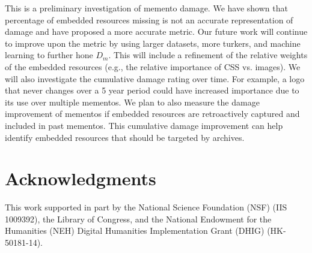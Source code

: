 This is a preliminary investigation of memento damage. We have shown that percentage of embedded resources missing is not an accurate representation of damage and have proposed a more accurate metric.  Our future work will continue to improve upon the metric by using larger datasets, more turkers, and machine learning to further hone $D_m$. This will include a refinement of the relative weights of the embedded resources (e.g., the relative importance of CSS vs. images). We will also investigate the cumulative damage rating over time. For example, a logo that never changes over a 5 year period could have increased importance due to its use over multiple mementos. We plan to also measure the damage improvement of mementos if embedded resources are retroactively captured and included in past mementos. This cumulative damage improvement can help identify embedded resources that should be targeted by archives.



\section{Acknowledgments}
This work supported in part by the National Science Foundation (NSF) (IIS 1009392), the Library of Congress, and the National Endowment for the Humanities (NEH) Digital Humanities Implementation Grant (DHIG) (HK-50181-14).


